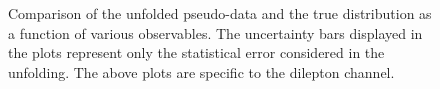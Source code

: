 \begin{figure}[ht]
  \quad\quad
  \caption{Comparison of the unfolded pseudo-data and the true distribution as a function of various observables. The uncertainty bars displayed in the plots represent only the statistical error considered in the unfolding. The above plots are specific to the dilepton channel.}
  \label{fig:unfolded_dilep_dist_closure_1}
\end{figure}

